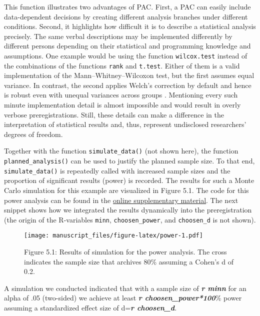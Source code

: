 \documentclass[psych,tutorial,submit,moreauthors,pdftex]{mdpi}
\newenvironment{Shaded}{\begin{snugshade}}{\end{snugshade}}
\newcommand{\InformationTok}[1]{\textcolor[rgb]{0.56,0.35,0.01}{\textbf{\textit{#1}}}}
\newcommand{\NormalTok}[1]{#1}
\begin{document}
This function illustrates two advantages of PAC. First, a PAC can easily
include data-dependent decisions by creating different analysis branches
under different conditions. Second, it highlights how difficult it is to
describe a statistical analysis precisely. The same verbal descriptions
may be implemented differently by different persons depending on their
statistical and programming knowledge and assumptions. One example would
be using the function \texttt{wilcox.test} instead of the combinations
of the functions \texttt{rank} and \texttt{t.test}. Either of them is a
valid implementation of the Mann--Whitney--Wilcoxon test, but the first
assumes equal variance. In contrast, the second applies Welch's
correction by default and hence is robust even with unequal variances
across groups \citep{zimmermanRankTransformationsPower1993}. Mentioning
every such minute implementation detail is almost impossible and would
result in overly verbose preregistrations. Still, these details can make
a difference in the interpretation of statistical results and, thus,
represent undisclosed researchers' degrees of freedom.

Together with the function \texttt{simulate\_data()} (not shown here),
the function \texttt{planned\_analysis()} can be used to justify the
planned sample size. To that end, \texttt{simulate\_data()} is
repeatedly called with increased sample sizes and the proportion of
significant results (power) is recorded. The results for such a Monte
Carlo simulation for this example are visualized in Figure 5.1. The code
for this power analysis can be found in the
\href{https://github.com/aaronpeikert/repro-tutorial/blob/main/R/simulation.R}{online
supplementary material}. The next snippet shows how we integrated the
results dynamically into the preregistration (the origin of the
R-variables \texttt{minn}, \texttt{choosen\_power}, and
\texttt{choosen\_d} is not shown).

\begin{figure}
\centering
\texttt{[image: manuscript\_files/figure-latex/power-1.pdf]}
\caption{Figure 5.1: Results of simulation for the power analysis. The
cross indicates the sample size that archives 80\% assuming a Cohen's d
of 0.2.}
\end{figure}

\begin{Shaded}
\begin{Highlighting}[]
\NormalTok{A simulation we conducted indicated that with a sample size of }\InformationTok{\textasciigrave{}r minn\textasciigrave{}}\NormalTok{ for}
\NormalTok{an alpha of .05 (two{-}sided) we achieve at least }\InformationTok{\textasciigrave{}r choosen\_power*100\textasciigrave{}}\NormalTok{\% power}
\NormalTok{assuming a standardized effect size of d=}\InformationTok{\textasciigrave{}r choosen\_d\textasciigrave{}}\NormalTok{.}
\end{Highlighting}
\end{Shaded}
\end{document}
